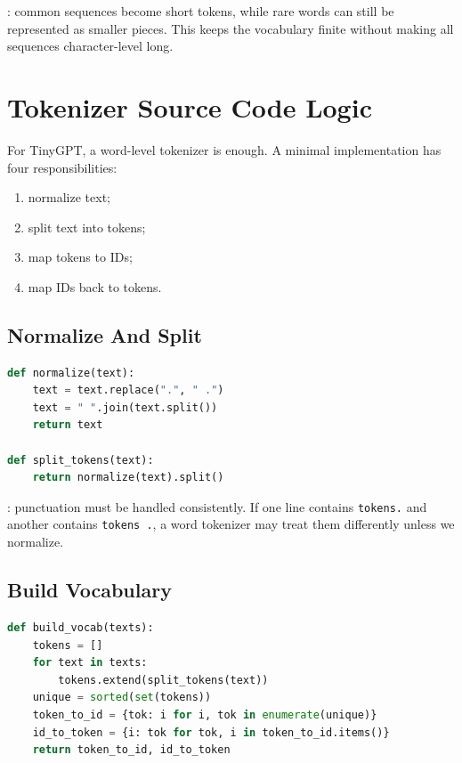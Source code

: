 : common sequences become short tokens, while rare words can still be represented as smaller pieces. This keeps the vocabulary finite without making all sequences character-level long.

\section{Tokenizer Source Code Logic}

For TinyGPT, a word-level tokenizer is enough. A minimal implementation has four responsibilities:

\begin{enumerate}
  \item normalize text;
  \item split text into tokens;
  \item map tokens to IDs;
  \item map IDs back to tokens.
\end{enumerate}

\subsection{Normalize And Split}

\begin{lstlisting}[language=Python]
def normalize(text):
    text = text.replace(".", " .")
    text = " ".join(text.split())
    return text

def split_tokens(text):
    return normalize(text).split()
\end{lstlisting}

: punctuation must be handled consistently. If one line contains \texttt{tokens.} and another contains \texttt{tokens .}, a word tokenizer may treat them differently unless we normalize.

\subsection{Build Vocabulary}

\begin{lstlisting}[language=Python]
def build_vocab(texts):
    tokens = []
    for text in texts:
        tokens.extend(split_tokens(text))
    unique = sorted(set(tokens))
    token_to_id = {tok: i for i, tok in enumerate(unique)}
    id_to_token = {i: tok for tok, i in token_to_id.items()}
    return token_to_id, id_to_token
\end{lstlisting}

